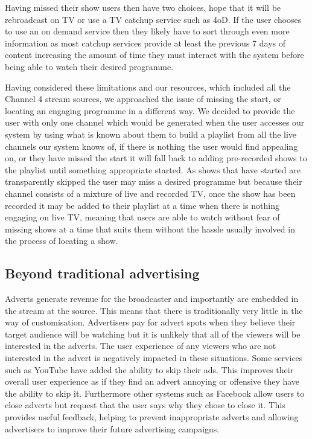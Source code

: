 Having missed their show users then have two choices, hope that it will be rebroadcast on TV or use a TV catchup service such as 4oD. If the user chooses to use an on demand service then they likely have to sort through even more information as most catchup services provide at least the previous 7 days of content increasing the amount of time they must interact with the system before being able to watch their desired programme.

Having considered these limitations and our resources, which included all the Channel 4 stream sources, we approached the issue of missing the start, or locating an engaging programme in a different way. We decided to provide the user with only one channel which would be generated when the user accesses our system by using what is known about them to build a playlist from all the live channels our system knows of, if there is nothing the user would find appealing on, or they have missed the start it will fall back to adding pre-recorded shows to the playlist until something appropriate started. As shows that have started are transparently skipped the user may miss a desired programme but because their channel consists of a mixture of live and recorded TV, once the show has been recorded it may be added to their playlist at a time when there is nothing engaging on live TV, meaning that users are able to watch without fear of missing shows at a time that suits them without the hassle usually involved in the process of locating a show.

\subsection{Beyond traditional advertising}
Adverts generate revenue for the broadcaster and importantly are embedded in the stream at the source. This means that there is traditionally very little in the way of customisation. Advertisers pay for advert spots when they believe their target audience will be watching but it is unlikely that all of the viewers will be interested in the adverts. The user experience of any viewers who are not interested in the advert is negatively impacted in these situations. Some services such as YouTube have added the ability to skip their ads. This improves their overall user experience as if they find an advert annoying or offensive they have the ability to skip it. Furthermore other systems such as Facebook allow users to close adverts but request that the user says why they chose to close it. This provides useful feedback, helping to prevent inappropriate adverts and allowing advertisers to improve their future advertising campaigns.

